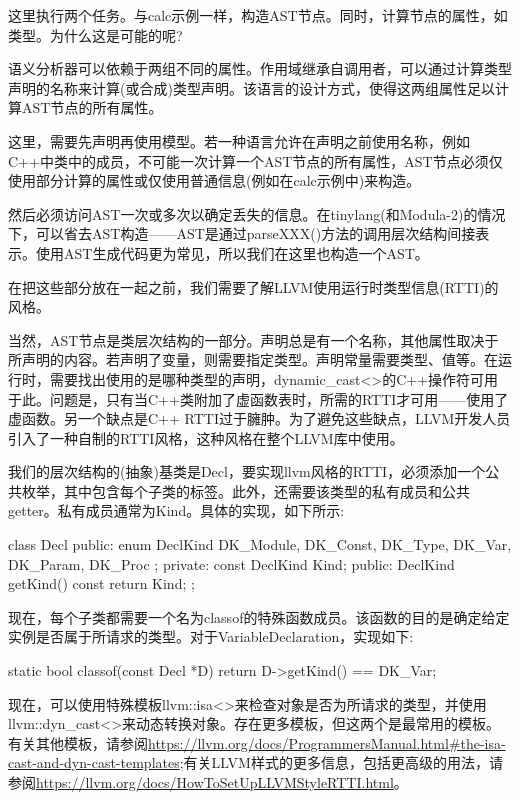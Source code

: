 这里执行两个任务。与calc示例一样，构造AST节点。同时，计算节点的属性，如类型。为什么这是可能的呢?

语义分析器可以依赖于两组不同的属性。作用域继承自调用者，可以通过计算类型声明的名称来计算(或合成)类型声明。该语言的设计方式，使得这两组属性足以计算AST节点的所有属性。

这里，需要先声明再使用模型。若一种语言允许在声明之前使用名称，例如C++中类中的成员，不可能一次计算一个AST节点的所有属性，AST节点必须仅使用部分计算的属性或仅使用普通信息(例如在calc示例中)来构造。

然后必须访问AST一次或多次以确定丢失的信息。在tinylang(和Modula-2)的情况下，可以省去AST构造——AST是通过parseXXX()方法的调用层次结构间接表示。使用AST生成代码更为常见，所以我们在这里也构造一个AST。

在把这些部分放在一起之前，我们需要了解LLVM使用运行时类型信息(RTTI)的风格。


当然，AST节点是类层次结构的一部分。声明总是有一个名称，其他属性取决于所声明的内容。若声明了变量，则需要指定类型。声明常量需要类型、值等。在运行时，需要找出使用的是哪种类型的声明，dynamic\_cast<>的C++操作符可用于此。问题是，只有当C++类附加了虚函数表时，所需的RTTI才可用——使用了虚函数。另一个缺点是C++ RTTI过于臃肿。为了避免这些缺点，LLVM开发人员引入了一种自制的RTTI风格，这种风格在整个LLVM库中使用。

我们的层次结构的(抽象)基类是Decl，要实现llvm风格的RTTI，必须添加一个公共枚举，其中包含每个子类的标签。此外，还需要该类型的私有成员和公共getter。私有成员通常为Kind。具体的实现，如下所示:

\begin{cpp}
class Decl {
public:
    enum DeclKind { DK_Module, DK_Const, DK_Type,
        DK_Var, DK_Param, DK_Proc };
private:
    const DeclKind Kind;
public:
    DeclKind getKind() const { return Kind; }
};
\end{cpp}

现在，每个子类都需要一个名为classof的特殊函数成员。该函数的目的是确定给定实例是否属于所请求的类型。对于VariableDeclaration，实现如下:

\begin{cpp}
static bool classof(const Decl *D) {
    return D->getKind() == DK_Var;
}
\end{cpp}

现在，可以使用特殊模板llvm::isa<>来检查对象是否为所请求的类型，并使用llvm::dyn\_cast<>来动态转换对象。存在更多模板，但这两个是最常用的模板。有关其他模板，请参阅\url{https://llvm.org/docs/ProgrammersManual.html#the-isa-cast-and-dyn-cast-templates};有关LLVM样式的更多信息，包括更高级的用法，请参阅\url{https://llvm.org/docs/HowToSetUpLLVMStyleRTTI.html}。

